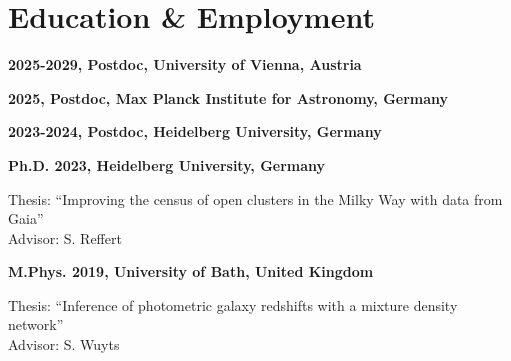 \section*{Education \& Employment}

\textbf{2025-2029, Postdoc, University of Vienna, Austria}
\vspace{0.2cm}

\textbf{2025, Postdoc, Max Planck Institute for Astronomy, Germany}
\vspace{0.2cm}

\textbf{2023-2024, Postdoc, Heidelberg University, Germany}
\vspace{0.2cm}

\textbf{Ph.D. 2023, Heidelberg University, Germany}
\begin{addmargin}[2em]{0em}
    Thesis: ``Improving the census of open clusters in the Milky Way with data from Gaia''\\
    Advisor: S. Reffert
\end{addmargin}
\vspace{0.2cm}

\textbf{M.Phys. 2019, University of Bath, United Kingdom}
\begin{addmargin}[2em]{0em}
    Thesis: ``Inference of photometric galaxy redshifts with a mixture density network''\\
    Advisor: S. Wuyts
\end{addmargin}